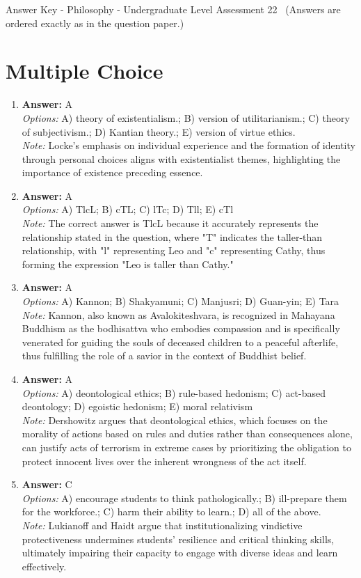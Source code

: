 \documentclass[12pt]{article}
\begin{document}
\begin{center}
Answer Key - Philosophy - Undergraduate Level Assessment 22 \
\small (Answers are ordered exactly as in the question paper.)
\end{center}

\section*{Multiple Choice}
\begin{enumerate}[label=\arabic*.]
\item \textbf{Answer:} A
\\ \textit{Options:} A) theory of existentialism.; B) version of utilitarianism.; C) theory of subjectivism.; D) Kantian theory.; E) version of virtue ethics.
\\ \textit{Note:} Locke's emphasis on individual experience and the formation of identity through personal choices aligns with existentialist themes, highlighting the importance of existence preceding essence.
\item \textbf{Answer:} A
\\ \textit{Options:} A) TlcL; B) cTL; C) lTc; D) Tll; E) cTl
\\ \textit{Note:} The correct answer is TlcL because it accurately represents the relationship stated in the question, where "T" indicates the taller-than relationship, with "l" representing Leo and "c" representing Cathy, thus forming the expression "Leo is taller than Cathy."
\item \textbf{Answer:} A
\\ \textit{Options:} A) Kannon; B) Shakyamuni; C) Manjusri; D) Guan-yin; E) Tara
\\ \textit{Note:} Kannon, also known as Avalokiteshvara, is recognized in Mahayana Buddhism as the bodhisattva who embodies compassion and is specifically venerated for guiding the souls of deceased children to a peaceful afterlife, thus fulfilling the role of a savior in the context of Buddhist belief.
\item \textbf{Answer:} A
\\ \textit{Options:} A) deontological ethics; B) rule-based hedonism; C) act-based deontology; D) egoistic hedonism; E) moral relativism
\\ \textit{Note:} Dershowitz argues that deontological ethics, which focuses on the morality of actions based on rules and duties rather than consequences alone, can justify acts of terrorism in extreme cases by prioritizing the obligation to protect innocent lives over the inherent wrongness of the act itself.
\item \textbf{Answer:} C
\\ \textit{Options:} A) encourage students to think pathologically.; B) ill-prepare them for the workforce.; C) harm their ability to learn.; D) all of the above.
\\ \textit{Note:} Lukianoff and Haidt argue that institutionalizing vindictive protectiveness undermines students' resilience and critical thinking skills, ultimately impairing their capacity to engage with diverse ideas and learn effectively.
\end{enumerate}
\end{document}
